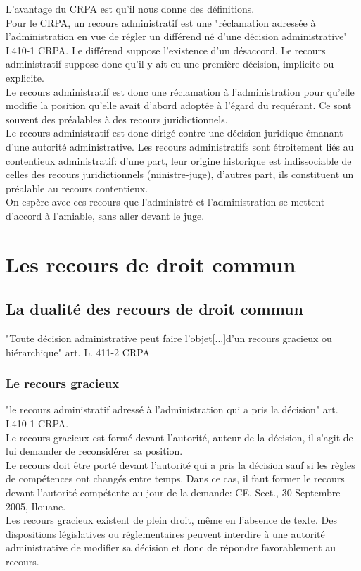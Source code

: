 \documentclass[10pt, a4paper, openany]{book}
\begin{document}
L'avantage du CRPA est qu'il nous donne des définitions. \\
Pour le CRPA, un recours administratif est une "réclamation adressée à l'administration en vue de régler un différend né d'une décision administrative" L410-1 CRPA. Le différend suppose l'existence d'un désaccord. Le recours administratif suppose donc qu'il y ait eu une première décision, implicite ou explicite. \\
Le recours administratif est donc une réclamation à l'administration pour qu'elle modifie la position qu'elle avait d'abord adoptée à l'égard du requérant. Ce sont souvent des préalables à des recours juridictionnels. \\
Le recours administratif est donc dirigé contre une décision juridique émanant d'une autorité administrative. Les recours administratifs sont étroitement liés au contentieux administratif: d'une part, leur origine historique est indissociable de celles des recours juridictionnels (ministre-juge), d'autres part, ils constituent un préalable au recours contentieux. \\
On espère avec ces recours que l'administré et l'administration se mettent d'accord à l'amiable, sans aller devant le juge. 

\section{Les recours de droit commun}

\subsection{La dualité des recours de droit commun}

"Toute décision administrative peut faire l'objet[...]d'un recours gracieux ou hiérarchique" art. L. 411-2 CRPA

\subsubsection{Le recours gracieux}

"le recours administratif adressé à l'administration qui a pris la décision" art. L410-1 CRPA. \\
Le recours gracieux est formé devant l'autorité, auteur de la décision, il s'agit de lui demander de reconsidérer sa position. \\
Le recours doit être porté devant l'autorité qui a pris la décision sauf si les règles de compétences ont changés entre temps. Dans ce cas, il faut former le recours devant l'autorité compétente au jour de la demande: CE, Sect., 30 Septembre 2005, Ilouane. \\
Les recours gracieux existent de plein droit, même en l'absence de texte. Des dispositions législatives ou réglementaires peuvent interdire à une autorité administrative de modifier sa décision et donc de répondre favorablement au recours. 
\end{document}
